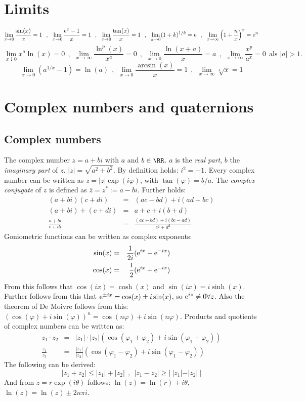 \section{Limits}
\[
\lim_{x\rightarrow0}\frac{\sin(x)}{x}=1~~,~~
\lim_{x\rightarrow0}\frac{{\rm e}^x-1}{x}=1~~,~~
\lim_{x\rightarrow0}\frac{\tan(x)}{x}=1~~,~~
\lim_{k\rightarrow0}(1+k)^{1/k}={\rm e}~~,~~
\lim_{x\rightarrow\infty}\left(1+\frac{n}{x}\right)^x={\rm e}^n
\]
\[
\lim_{x\downarrow0}x^a\ln(x)=0~~,~~
\lim_{x\rightarrow\infty}\frac{\ln^p(x)}{x^a}=0~~,~~
\lim_{x\rightarrow0}\frac{\ln(x+a)}{x}=a~~,~~
\lim_{x\rightarrow\infty}\frac{x^p}{a^x}=0~~\mbox{als }|a|>1.
\]
\[
\lim_{x\rightarrow0}\left(a^{1/x}-1\right)=\ln(a)~~,~~
\lim_{x\rightarrow0}\frac{\arcsin(x)}{x}=1~~,~~
\lim_{x\rightarrow\infty}\sqrt[x]{x}=1
\]

\section{Complex numbers and quaternions}
\subsection{Complex numbers}
The complex number $z=a+bi$ with $a$ and $b\in\RR$. $a$ is the {\it real part},
$b$ the {\it imaginary part} of $z$. $|z|=\sqrt{a^2+b^2}$. By definition
holds: $i^2=-1$. Every complex number can be written as $z=|z|\exp(i\varphi)$,
with $\tan(\varphi)=b/a$. The {\it complex conjugate} of $z$ is defined as
$\overline{z}=z^*:=a-bi$. Further holds:
\begin{eqnarray*}
(a+bi)(c+di)&=&(ac-bd)+i(ad+bc)\\
(a+bi)+(c+di)&=&a+c+i(b+d)\\
\frac{a+bi}{c+di}&=&\frac{(ac+bd)+i(bc-ad)}{c^2+d^2}
\end{eqnarray*}
Goniometric functions can be written as complex exponents:
\begin{eqnarray*}
\sin(x)&=&\frac{1}{2i}({\rm e}^{ix}-{\rm e}^{-ix})\\
\cos(x)&=&\frac{1}{2}({\rm e}^{ix}+{\rm e}^{-ix})
\end{eqnarray*}
From this follows that $\cos(ix)=\cosh(x)$ and $\sin(ix)=i\sinh(x)$.
Further follows from this that\newline
${\rm e}^{\pm ix}=\cos(x)\pm i\sin(x)$, so
${\rm e}^{iz}\neq0\forall z$. Also the theorem of De Moivre follows from
this:\\ $(\cos(\varphi)+i\sin(\varphi))^n=\cos(n\varphi)+i\sin(n\varphi)$.
\npar
Products and quotients of complex numbers can be written as:
\begin{eqnarray*}
z_1\cdot z_2&=&|z_1|\cdot|z_2|(\cos(\varphi_1+\varphi_2)+i\sin(\varphi_1+\varphi_2))\\
\frac{z_1}{z_2}&=&\frac{|z_1|}{|z_2|}(\cos(\varphi_1-\varphi_2)+i\sin(\varphi_1-\varphi_2))
\end{eqnarray*}
The following can be derived:
\[
|z_1+z_2|\leq|z_1|+|z_2|~~,~~|z_1-z_2|\geq|~|z_1|-|z_2|~|
\]
And from $z=r\exp(i\theta)$ follows: $\ln(z)=\ln(r)+i\theta$, $\ln(z)=\ln(z)\pm2n\pi i$.

